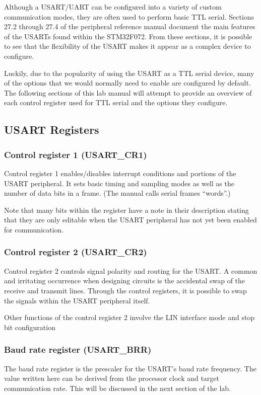 \documentclass[11pt,fleqn]{book} %
\begin{document}
Although a USART/UART can be configured into a variety of custom communication modes, they are often used to perform basic TTL serial. Sections 27.2 through 27.4 of the peripheral reference manual document the main features of the USARTs found within the STM32F072. From these sections, it is possible to see that the flexibility of the USART makes it appear as a complex device to configure. 

Luckily, due to the popularity of using the USART as a TTL serial device, many of the options that we would normally need to enable are configured by default. The following sections of this lab manual will attempt to provide an overview of each control register used for TTL serial and the options they configure. 

\subsection{USART Registers}	

\subsubsection{Control register 1 (USART\_CR1)}
Control register 1 enables/disables interrupt conditions and portions of the USART peripheral. It sets basic timing and sampling modes as well as the number of data bits in a frame. (The manual calls serial frames ``words''.) 

Note that many bits within the register have a note in their description stating that they are only editable when the USART peripheral has not yet been enabled for communication. 

\subsubsection{Control register 2 (USART\_CR2)}
Control register 2 controls signal polarity and routing for the USART. A common and irritating occurrence when designing circuits is the accidental swap of the receive and transmit lines. Through the control registers, it is possible to swap the signals within the USART peripheral itself. 

Other functions of the control register 2 involve the LIN interface mode and stop bit configuration 

\subsubsection{Baud rate register (USART\_BRR)}
The baud rate register is the prescaler for the USART's baud rate frequency. The value written here can be derived from the processor clock and target communication rate. This will be discussed in the next section of the lab.
\end{document}
